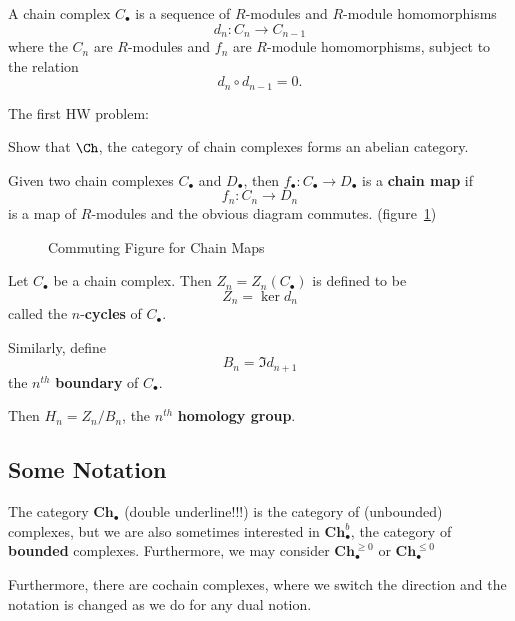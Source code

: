 \documentclass[12pt]{article}
\begin{document}
\begin{defn}
	A chain complex $C_\bullet$ is a sequence of $R$-modules and $R$-module homomorphisms
	\[d_n:C_n\to C_{n-1}\]
	where the $C_n$ are $R$-modules and $f_n$ are $R$-module homomorphisms, subject to the relation
	\[d_n\circ d_{n-1}=0.\]
\end{defn}
The first HW problem:
\begin{prob}
	Show that $\Ch$, the category of chain complexes forms an abelian category.
\end{prob}

\begin{defn}
	Given two chain complexes $C_\bullet$ and $D_\bullet$, then $f_\bullet:C_\bullet\to D_\bullet$
	is a \textbf{chain map} if
	\[f_n:C_n\to D_n\]
	is a map of $R$-modules and the obvious diagram commutes. (figure~\ref{fig-commute})
\end{defn}
\begin{figure}\label{fig-commute}
	\centering
	\caption{Commuting Figure for Chain Maps}
\end{figure}

\begin{defn}
	Let $C_\bullet$ be a chain complex. Then $Z_n=Z_n(C_\bullet)$ is defined to be
	\[Z_n=\ker d_n\]
	called the $n$-\textbf{cycles} of $C_\bullet$.

	Similarly, define
	\[B_n=\Im d_{n+1}\]
	the $n^{th}$ \textbf{boundary} of $C_\bullet$. 

	Then $H_n=Z_n/B_n$, the $n^{th}$ \textbf{homology group}. 
\end{defn}

\subsection{Some Notation}
The category $\mathbf{Ch}_\bullet$ (double underline!!!) is the category of (unbounded) complexes,
but we are also sometimes interested in $\mathbf{Ch}_\bullet^b$, the category of \textbf{bounded}
complexes. Furthermore, we may consider $\mathbf{Ch}_\bullet^{\ge 0}$ or $\mathbf{Ch}_\bullet^{\le 0}$

Furthermore, there are cochain complexes, where we switch the direction and the notation is changed as
we do for any dual notion.
\end{document}
